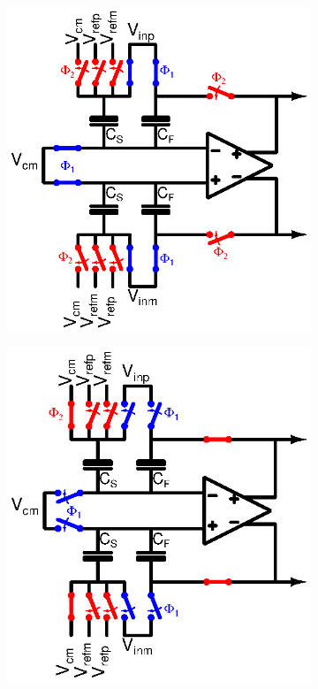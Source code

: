 \begin{figure}[htp]
	\centering
	\begin{subfigure}[b]{0.4\textwidth}
		\centering
		\includegraphics[width=\textwidth]{Chapter4/Figs/algorithmic-mdac-phi1.ps}
		\label{fig:algo-mdac-phi1}
	\end{subfigure}
	\begin{subfigure}[b]{0.4\textwidth}
		\centering
		\includegraphics[width=\textwidth]{Chapter4/Figs/algorithmic-mdac-phi2.ps}

\end{subfigure}
\end{figure}
